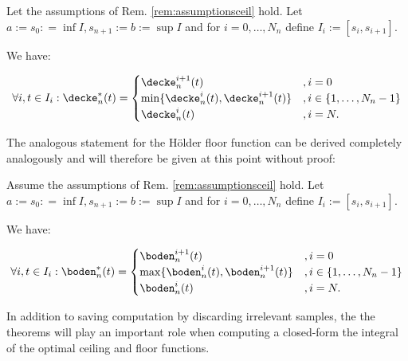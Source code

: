 \begin{thm}\label{thm:lipceil1d}
Let the assumptions of Rem. \ref{rem:assumptionsceil} hold.
Let $a:=s_0: = \inf I, s_{n+1} := b:=\sup I$ and for $i=0,\ldots,N_n$ define $I_i := [s_i,s_{i+1}]$.


We have:

\[ \forall i, t \in I_i: \decke_n^*(t) = \begin{cases} \decke_n^{i+1}(t) &, i=0\\
															\min\{\decke_n^i(t),\decke_n^{i+1}(t) \}&, i \in \{1,\ldots,N_n-1 \} \\
															\decke_n^{i}(t)&, i=N.	\end{cases} \]


\end{thm}



The analogous statement for the H\"older floor function can be derived completely analogously and will therefore be given at this point without proof:


\begin{thm}\label{thm:lipfloor1d}
Assume the assumptions of Rem. \ref{rem:assumptionsceil} hold.
Let $a:=s_0: = \inf I, s_{n+1} := b:=\sup I$ and for $i=0,\ldots,N_n$ define $I_i := [s_i,s_{i+1}]$.


We have:

\[ \forall i, t \in I_i: \boden_n^*(t) = \begin{cases} \boden_n^{i+1}(t) &, i=0\\
															\max\{\boden_n^i(t),\boden_n^{i+1}(t) \}&, i \in \{1,\ldots,N_n-1 \} \\
															\boden_n^{i}(t)&, i=N.	\end{cases} \]


\end{thm}

In addition to saving computation by discarding irrelevant samples, the the theorems will play an important role when computing a closed-form the integral of the optimal ceiling and floor functions.


